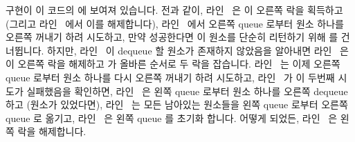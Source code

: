 \begin{fcvref}
 구현이 이 코드의  에 보여져 있습니다.
전과 같이, 라인~ 은 이 오른쪽 락을 획득하고 (그리고
라인~ 에서 이를 해제합니다), 라인~ 에서 오른쪽
queue 로부터 원소 하나를 오른쪽 꺼내기 하려 시도하고, 만약 성공한다면 이 원소를
단순히 리턴하기 위해  를 건너뜁니다.
하지만, 라인~ 이 dequeue 할 원소가 존재하지 않았음을 알아내면
라인~ 은 이 오른쪽 락을 해제하고  가
올바른 순서로 두 락을 잡습니다.
라인~ 는 이제 오른쪽 queue 로부터 원소 하나를 다시 오른쪽 꺼내기
하려 시도하고, 라인~ 가 이 두번째 시도가 실패했음을 확인하면,
라인~ 은 왼쪽 queue 로부터 원소 하나를 오른쪽 dequeue 하고
(원소가 있었다면), 라인~ 는 모든 남아있는 원소들을 왼쪽 queue
로부터 오른쪽 queue 로 옮기고, 라인~ 은 왼쪽 queue 를 초기화
합니다.
어떻게 되었든, 라인~ 은 왼쪽 락을 해제합니다.
\end{fcvref}

\iffalse

